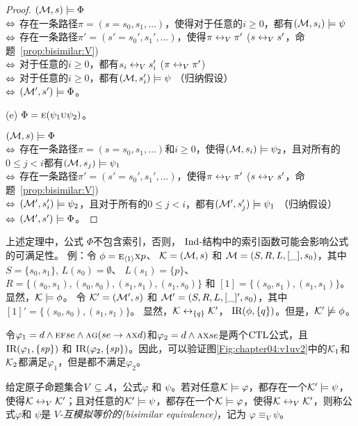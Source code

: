 \begin{proof}
	$({\cal M},s)\models \Phi$\\
	$\Leftrightarrow$ 存在一条路径$\pi=(s=s_0,s_1,\dots)$，使得对于任意的$i\ge 0$，都有$({\cal M},s_i)\models \psi$\\
	$\Leftrightarrow$ 存在一条路径$\pi'=(s'=s_0',s_1',\dots)$，使得$\pi \leftrightarrow_V \pi'$ \hfill ($s \leftrightarrow_V s'$，命题~\ref{prop:bisimilar:V})\\
	$\Leftrightarrow$ 对于任意的$i\ge 0$，都有$s_i \leftrightarrow_V s_i'$ \hfill ($\pi \leftrightarrow_V \pi'$)\\
	$\Leftrightarrow$ 对于任意的$i\ge 0$，都有$({\cal M},s_i') \models \psi$ \hfill （归纳假设）\\
	$\Leftrightarrow$ $({\cal M}',s')\models \Phi$。
	
	(e) $\Phi = \textsc{e} (\psi_1 \textsc{u} \psi_2)$。
	
	$({\cal M},s) \models \Phi$\\
	$\Leftrightarrow$ 存在一条路径$\pi=(s=s_0,s_1,\dots)$和$i \ge 0$，使得$({\cal M},s_i) \models \psi_2$，且对所有的$0\leq j <i$都有$({\cal M},s_j)\models \psi_1$\\
	$\Leftrightarrow$ 存在一条路径$\pi'=(s'=s_0',s_1',\dots)$，使得$\pi \leftrightarrow_V \pi'$ \hfill ($s \leftrightarrow_V s'$，命题~\ref{prop:bisimilar:V})\\
	$\Leftrightarrow$ $({\cal M}',s_i') \models \psi_2$，且对于所有的$0\leq j <i$，都有$({\cal M}',s_j')\models \psi_1$  \hfill  （归纳假设）\\
	$\Leftrightarrow$ $({\cal M}',s')\models \Phi$。
\end{proof}

上述定理中，公式 $\Phi$不包含索引，否则， $\textrm{Ind}$-结构中的索引函数可能会影响公式的可满足性。
例：令 $\phi=\textsc{e}_{{\langle{1}\rangle}}\textsc{x} p$、
${\cal K}=({\cal M},s)$ 和 ${\cal M}=(S,R,L,[\_],s_0)$，其中 $S=\{s_0,s_1\}$, $L(s_0)=\emptyset$、 $L(s_1)=\{p\}$、
$R=\{(s_0,s_1),(s_0,s_0),(s_1,s_1), (s_1,s_0)\}$ 和 $[1]=\{(s_0,s_1), (s_1,s_1)\}$。显然，${\cal K}\models\phi$。
令 ${\cal K}'=({\cal M}',s)$ 和 ${\cal M}'=(S,R,L,[\_]',s_0)$，其中 $[1]'=\{(s_0,s_0),(s_1,s_1)\}$。
显然，${\cal K}\leftrightarrow_{\{q\}}{\cal K}'$， $\textrm{IR}(\phi,\{q\})$。但是，${\cal K}'\not\models\phi$。

\begin{example}
	令$\varphi_1 = d \wedge \textsc{e}\textsc{f} se \wedge \textsc{a}\textsc{g}(se \rightarrow \textsc{a}\textsc{x} d)$和$\varphi_2=d \wedge \textsc{a}\textsc{x} se$是两个$\textrm{CTL}$公式，且$\textrm{IR}(\varphi_1,\{sp\})$ 和 $\textrm{IR}(\varphi_2,\{sp\})$。因此，可以验证图\ref{Fig:chapter04:v1uv2}中的${\cal K}_1$和${\cal K}_2$都满足$\varphi_1$，但是都不满足$\varphi_2$。
\end{example}

\begin{definition}\label{def:bisimular:equivalene}
	给定原子命题集合$V\subseteq {\cal A}$，公式$\varphi$ 和 $\psi$。若对任意${\cal K}\models \varphi$，都存在一个${\cal K}'\models\psi$，使得${\cal K}\leftrightarrow_V{\cal K}'$；且对任意的${\cal K}'\models\psi$，都存在一个${\cal K}\models \varphi$，使得${\cal K}\leftrightarrow_V{\cal K}'$，则称公式$\varphi$和 $\psi$是 {\em $V$-互模拟等价的(bisimilar equivalence)}，记为 $\varphi\equiv_V\psi$。
\end{definition}

